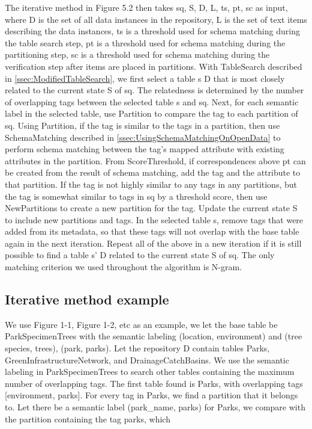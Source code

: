The iterative method in Figure 5.2 then takes sq, S, D, L, ts, pt, sc as input, where D is the set of all data instances in the repository, L is the set of text items describing the data instances, ts is a threshold used for schema matching during the table search step, pt is a threshold used for schema matching during the partitioning step, sc is a threshold used for schema matching during the verification step after items are placed in partitions.
With TableSearch described in \autoref{ssec:ModifiedTableSearch}, we first select a table s  D that is most closely related to the current state S of sq. The relatedness is determined by the number of overlapping tags between the selected table s and sq. Next, for each semantic label in the selected table, use Partition to compare the tag to each partition of sq. Using Partition, if the tag is similar to the tags in a partition, then use SchemaMatching described in \autoref{ssec:UsingSchemaMatchingOnOpenData} to perform schema matching between the tag's mapped attribute with existing attributes in the partition. From ScoreThreshold, if correspondences above pt can be created from the result of schema matching, add the tag and the attribute to that partition. If the tag is not highly similar to any tags in any partitions, but the tag is somewhat similar to tags in sq by a threshold score, then use NewPartitions to create a new partition for the tag. Update the current state S to include new partitions and tags. In the selected table s, remove tags that were added from its metadata, so that these tags will not overlap with the base table again in the next iteration. Repeat all of the above in a new iteration if it is still possible to find a table s'  D related to the current state S of sq. The only matching criterion we used throughout the algorithm is N-gram.

\subsection{Iterative method example}
\label{ssec:IterativeMethodExample}

We use Figure 1-1, Figure 1-2, etc as an example, we let the base table be ParkSpecimenTrees with the semantic labeling (location, environment) and (tree species, trees), (park, parks). Let the repository D contain tables Parks, GreenInfrastructureNetwork, and DrainageCatchBasins. We use the semantic labeling in ParkSpecimenTrees to search other tables containing the maximum number of overlapping tags. The first table found is Parks, with overlapping tags [environment, parks]. For every tag in Parks, we find a partition that it belongs to. Let there be a semantic label (park\_name, parks) for Parks, we compare with the partition containing the tag parks, which

